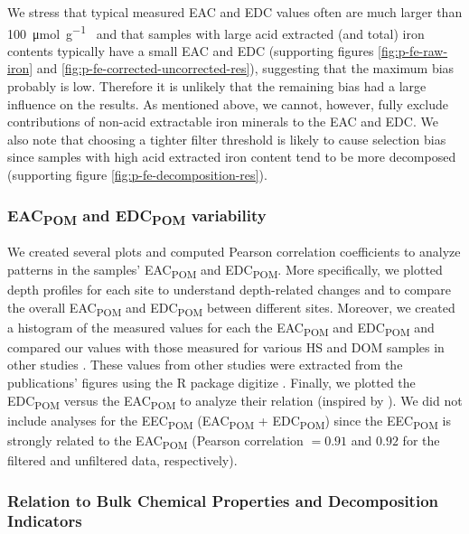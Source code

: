 \documentclass[alpha-refs, lineno]{wiley-article-rmd}
\begin{document}
We stress that typical measured EAC and EDC values often are much larger than \SI{100}{\micro\mol\per\gram\carbon} and that samples with large acid extracted (and total) iron contents typically have a small EAC and EDC (supporting figures \ref{fig:p-fe-raw-iron} and \ref{fig:p-fe-corrected-uncorrected-res}), suggesting that the maximum bias probably is low. Therefore it is unlikely that the remaining bias had a large influence on the results. As mentioned above, we cannot, however, fully exclude contributions of non-acid extractable iron minerals to the EAC and EDC. We also note that choosing a tighter filter threshold is likely to cause selection bias since samples with high acid extracted iron content tend to be more decomposed (supporting figure \ref{fig:p-fe-decomposition-res}).

\hypertarget{eac-and-edc-variability}{%
\subsubsection{\texorpdfstring{EAC\textsubscript{POM} and EDC\textsubscript{POM} variability}{EAC and EDC variability}}\label{eac-and-edc-variability}}

We created several plots and computed Pearson correlation coefficients to analyze patterns in the samples' EAC\textsubscript{POM} and EDC\textsubscript{POM}.
More specifically, we plotted depth profiles for each site to understand depth-related changes and to compare the overall EAC\textsubscript{POM} and EDC\textsubscript{POM} between different sites. Moreover, we created a histogram of the measured values for each the EAC\textsubscript{POM} and EDC\textsubscript{POM} and compared our values with those measured for various HS and DOM samples in other studies \autocite{Aeschbacher.2012,Tan.2017,Walpen.2018}. These values from other studies were extracted from the publications' figures using the R package digitize \autocite{Poisot.2011}. Finally, we plotted the EDC\textsubscript{POM} versus the EAC\textsubscript{POM} to analyze their relation (inspired by \textcite{Aeschbacher.2012}). We did not include analyses for the EEC\textsubscript{POM} (EAC\textsubscript{POM} + EDC\textsubscript{POM}) since the EEC\textsubscript{POM} is strongly related to the EAC\textsubscript{POM} (Pearson correlation \(=0.91\) and \(0.92\) for the filtered and unfiltered data, respectively).

\hypertarget{relation-to-bulk-chemical-properties-and-decomposition-indicators}{%
\subsubsection{Relation to Bulk Chemical Properties and Decomposition Indicators}\label{relation-to-bulk-chemical-properties-and-decomposition-indicators}}
\end{document}
